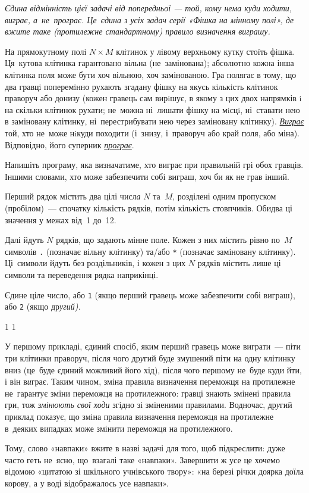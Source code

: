 ﻿{\it Єдина відмінність цієї задачі від попередньої --- той, кому нема куди ходити, виграє, а~не~програє. Це~єдина з усіх задач серії «Фішка на мінному полі», де вжите таке (протилежне стандартному) правило визначення виграшу.}

На прямокутному полi $N{\times}M$ клiтинок у лiвому верхньому кутку стоїть фішка. Ця~кутова клітинка гарантовано вільна (не~замінована); абсолютно кожна інша клітинка п{\it о}ля може бути хоч вільною, хоч замінованою. 
Гра полягає в тому, що два гравцi поперемiнно рухають згадану фішку на якусь кiлькiсть клiтинок праворуч або донизу (кожен гравець сам вирiшує, в якому з цих двох напрямків i на скільки клітинок рухати; не~можна ні~лишати фішку на мiсцi, ні~ставати нею в заміновану клітинку, ні~перестрибувати нею через заміновану клітинку).
\underline{\it Виграє} той, хто не~може нiкуди походити (і~знизу, і~праворуч або край п{\it о}ля, або міна). Відповідно, його суперник \underline{\it програє}.

Напишіть програму, яка визначатиме, хто виграє при правильній грі обох гравців. 
Іншими словами, хто може забезпечити собі виграш, хоч би як не грав інший.

\InputFile
Перший рядок містить два цілі числ{\it а} $N$ та~$M$, розділені одним пропуском (пробілом)~--- спочатку кількість рядків, потім кількість стовпчиків. Обидва ці значення у межах від~1 до~12.

Далі йдуть $N$ рядків, що задають мінне поле. Кожен з них містить рівно по~$M$ символів \texttt{.} (позначає вільну клітинку) та/або \texttt{*} (позначає заміновану клітинку). Ці~символи йдуть без роздільників, і кожен з цих $N$ рядків містить лише ці символи та переведення рядка наприкінці.

\OutputFile
Єдине ціле число, або \texttt{1} (якщо перший гравець може забезпечити собі виграш), або \texttt{2} (якщо др\it{у}гий).

\Examples
\begin{example}
{1
}
{1
}
\end{example}

\Note
У першому прикладі, єдиний спосіб, яким перший гравець може виграти~--- піти три клітинки праворуч, після чого др{\it у}гий буде змушений піти на одну клітинку вниз (це~буде єдиний можливий його хід), після чого першому не~буде куди йти, і він в{\it и}грає. 
Таким чином, зміна правила визначення переможця на протилежне не~гарантує зміни переможця на протилежного: гравці знають змінені правила гри, тож {\it змінюють свої ходи} згідно зі зміненими правилами. Водночас, др{\it у}гий приклад показує, що зміна правила визначення переможця на протилежне в~деяких випадках може змінити переможця на протилежного.

Тому, слово «навпаки» вжите в назві задачі для того, щоб підкреслити: дуже часто геть не~ясно, що~взагалі таке «навпаки». Завершити ж усе це хочемо відомою «цитатою зі шкільного учнівського твору»: «на березі річки доярка доїла корову, а у воді відображалось усе навпаки».